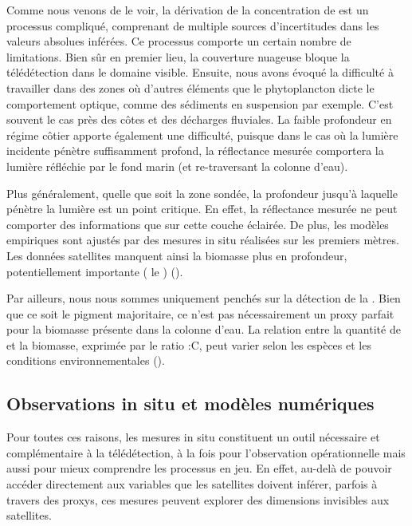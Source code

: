 Comme nous venons de le voir, la dérivation de la concentration de  est un processus compliqué, comprenant de multiple sources d'incertitudes dans les valeurs absolues inférées.
Ce processus comporte un certain nombre de limitations.
Bien sûr en premier lieu, la couverture nuageuse bloque la télédétection dans le domaine visible.
Ensuite, nous avons évoqué la difficulté à travailler dans des zones où d'autres éléments que le phytoplancton dicte le comportement optique, comme des sédiments en suspension par exemple.
C'est souvent le cas près des côtes et des décharges fluviales.
La faible profondeur en régime côtier apporte également une difficulté, puisque dans le cas où la lumière incidente pénètre suffisamment profond, la réflectance mesurée comportera la lumière réfléchie par le fond marin (et re-traversant la colonne d'eau).

Plus généralement, quelle que soit la zone sondée, la profondeur jusqu'à laquelle pénètre la lumière est un point critique.
En effet, la réflectance mesurée ne peut comporter des informations que sur cette couche éclairée.
De plus, les modèles empiriques sont ajustés par des mesures in situ réalisées sur les premiers mètres.
Les données satellites manquent ainsi la biomasse plus en profondeur, potentiellement importante ( le ) (\cite{morel_1989,uitz_2006}).

Par ailleurs, nous nous sommes uniquement penchés sur la détection de la . Bien que ce soit le pigment majoritaire, ce n'est pas nécessairement un proxy parfait pour la biomasse présente dans la colonne d'eau.
La relation entre la quantité de  et la biomasse, exprimée par le ratio \hbox{:C}, peut varier selon les espèces et les conditions environnementales (\cite{behrenfeld_2015,halsey_2015,inomura_2022}).


\subsection{Observations in situ et modèles numériques}

Pour toutes ces raisons, les mesures in situ constituent un outil nécessaire et complémentaire à la télédétection, à la fois pour l'observation opérationnelle mais aussi pour mieux comprendre les processus en jeu.
En effet, au-delà de pouvoir accéder directement aux variables que les satellites doivent inférer, parfois à travers des proxys, ces mesures peuvent explorer des dimensions invisibles aux satellites.

